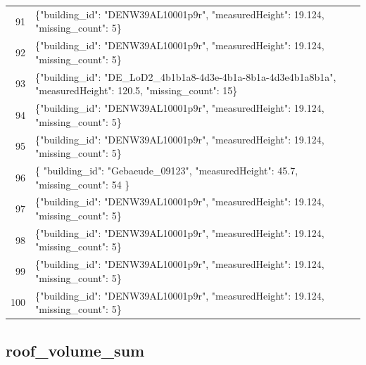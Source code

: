 \documentclass[a4paper,11pt]{article}
\begin{document}
\begin{table}[ht]
\begin{tabular}{r p{12cm}}
91 & \{"building\_id": "DENW39AL10001p9r", "measuredHeight": 19.124, "missing\_count": 5\} \\
92 & \{"building\_id": "DENW39AL10001p9r", "measuredHeight": 19.124, "missing\_count": 5\} \\
93 & \{"building\_id": "DE\_LoD2\_4b1b1a8-4d3e-4b1a-8b1a-4d3e4b1a8b1a", "measuredHeight": 120.5, "missing\_count": 15\} \\
94 & \{"building\_id": "DENW39AL10001p9r", "measuredHeight": 19.124, "missing\_count": 5\} \\
95 & \{"building\_id": "DENW39AL10001p9r", "measuredHeight": 19.124, "missing\_count": 5\} \\
96 & \{
  "building\_id": "Gebaeude\_09123",
  "measuredHeight": 45.7,
  "missing\_count": 54
\} \\
97 & \{"building\_id": "DENW39AL10001p9r", "measuredHeight": 19.124, "missing\_count": 5\} \\
98 & \{"building\_id": "DENW39AL10001p9r", "measuredHeight": 19.124, "missing\_count": 5\} \\
99 & \{"building\_id": "DENW39AL10001p9r", "measuredHeight": 19.124, "missing\_count": 5\} \\
100 & \{"building\_id": "DENW39AL10001p9r", "measuredHeight": 19.124, "missing\_count": 5\} \\
\hline
\end{tabular}
\end{table}

\clearpage
\subsection{roof\_volume\_sum}
\end{document}
